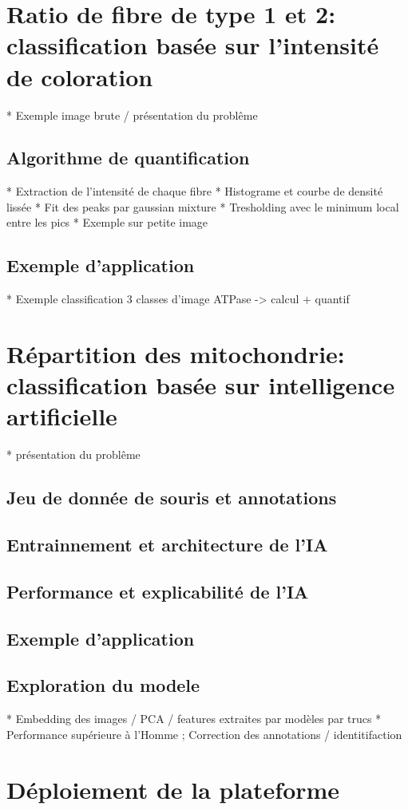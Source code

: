 \section{Ratio de fibre de type 1 et 2: classification basée sur l'intensité de coloration}
* Exemple image brute / présentation du problême
\subsection{Algorithme de quantification}
* Extraction de l'intensité de chaque fibre
* Histograme et courbe de densité lissée
* Fit des peaks par gaussian mixture
* Tresholding avec le minimum local entre les pics
* Exemple sur petite image

\subsection{Exemple d'application}
* Exemple classification 3 classes d'image ATPase -> calcul + quantif

\section{Répartition des mitochondrie: classification basée sur intelligence artificielle}
* présentation du problême
\subsection{Jeu de donnée de souris et annotations}
\subsection{Entrainnement et architecture de l'IA}
\subsection{ Performance et explicabilité de l'IA}
\subsection{Exemple d'application}
\subsection{Exploration du modele}
* Embedding des images / PCA / features extraites par modèles par trucs
* Performance supérieure à l'Homme ; Correction des annotations / identitifaction


\section{Déploiement de la plateforme}
